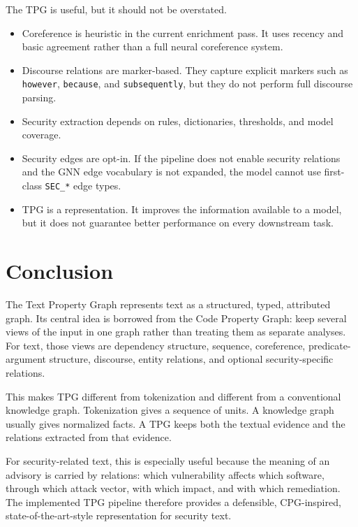 \documentclass[11pt]{article}
\begin{document}
The TPG is useful, but it should not be overstated.

\begin{itemize}
    \item Coreference is heuristic in the current enrichment pass. It uses
    recency and basic agreement rather than a full neural coreference system.
    \item Discourse relations are marker-based. They capture explicit markers
    such as \texttt{however}, \texttt{because}, and \texttt{subsequently}, but
    they do not perform full discourse parsing.
    \item Security extraction depends on rules, dictionaries, thresholds, and
    model coverage.
    \item Security edges are opt-in. If the pipeline does not enable security
    relations and the GNN edge vocabulary is not expanded, the model cannot use
    first-class \texttt{SEC\_*} edge types.
    \item TPG is a representation. It improves the information available to a
    model, but it does not guarantee better performance on every downstream
    task.
\end{itemize}

\section{Conclusion}

The Text Property Graph represents text as a structured, typed, attributed
graph. Its central idea is borrowed from the Code Property Graph: keep several
views of the input in one graph rather than treating them as separate analyses.
For text, those views are dependency structure, sequence, coreference,
predicate-argument structure, discourse, entity relations, and optional
security-specific relations.

This makes TPG different from tokenization and different from a conventional
knowledge graph. Tokenization gives a sequence of units. A knowledge graph
usually gives normalized facts. A TPG keeps both the textual evidence and the
relations extracted from that evidence.

For security-related text, this is especially useful because the meaning of an
advisory is carried by relations: which vulnerability affects which software,
through which attack vector, with which impact, and with which remediation.
The implemented TPG pipeline therefore provides a defensible, CPG-inspired,
state-of-the-art-style representation for security text.
\end{document}

